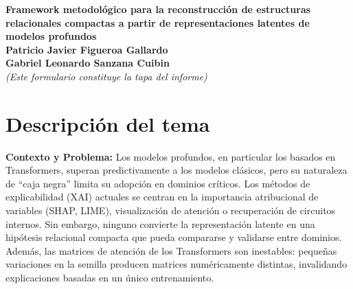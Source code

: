 \documentclass[12pt,letterpaper]{article}
\begin{document}
\thispagestyle{empty} %
\begin{center}
    \vspace*{3cm}
    {\fontsize{18}{22}\selectfont\textbf{Framework metodológico para la reconstrucción de estructuras relacionales compactas a partir de representaciones latentes de modelos profundos}}\\[3cm]
    
    {\large \textbf{Patricio Javier Figueroa Gallardo}}\\[0.5cm]
    {\large \textbf{Gabriel Leonardo Sanzana Cuibin}}\\[3cm]
    
    \textit{\small (Este formulario constituye la tapa del informe)}
\end{center}
\newpage

\setcounter{page}{1}

\section{Descripción del tema}

\textbf{Contexto y Problema:} Los modelos profundos, en particular los basados en Transformers, superan predictivamente a los modelos clásicos, pero su naturaleza de ``caja negra'' limita su adopción en dominios críticos. Los métodos de explicabilidad (XAI) actuales se centran en la importancia atribucional de variables (SHAP, LIME), visualización de atención o recuperación de circuitos internos. Sin embargo, ninguno convierte la representación latente en una hipótesis relacional compacta que pueda compararse y validarse entre dominios. Además, las matrices de atención de los Transformers son inestables: pequeñas variaciones en la semilla producen matrices numéricamente distintas, invalidando explicaciones basadas en un único entrenamiento.
\end{document}
